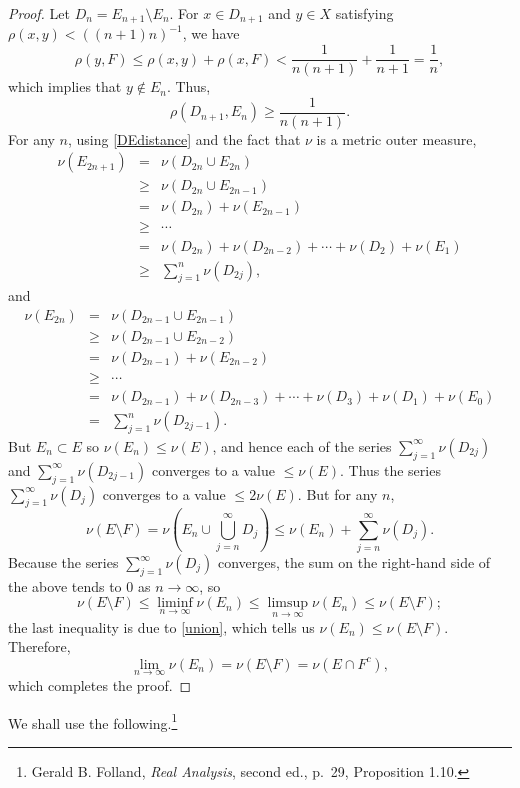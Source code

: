 \documentclass{article}
\theoremstyle{definition}
\theoremstyle{definition}
\begin{document}
\begin{proof}
Let $D_n = E_{n+1} \setminus E_n$. For $x \in D_{n+1}$ and  $y \in X$ satisfying $\rho(x,y) < ((n+1)n)^{-1}$, we have
\[
\rho(y,F) \leq \rho(x,y) + \rho(x,F) < \frac{1}{n(n+1)} + \frac{1}{n+1} = \frac{1}{n},
\]
which implies that $y \not \in E_n$. Thus,
\begin{equation}
\rho(D_{n+1},E_n) \geq \frac{1}{n(n+1)}.
\label{DEdistance}
\end{equation}
For any $n$, using \eqref{DEdistance} and the fact that $\nu$ is a metric outer measure,
\begin{eqnarray*}
\nu(E_{2n+1})&=&\nu(D_{2n} \cup E_{2n})\\
&\geq&\nu(D_{2n} \cup E_{2n-1})\\
&=&\nu(D_{2n})+\nu(E_{2n-1})\\
&\geq&\cdots\\
&=&\nu(D_{2n})+\nu(D_{2n-2})+\cdots+\nu(D_2)+\nu(E_1)\\
&\geq&\sum_{j=1}^n \nu(D_{2j}),
\end{eqnarray*}
and
\begin{eqnarray*}
\nu(E_{2n})&=&\nu(D_{2n-1} \cup E_{2n-1})\\
&\geq&\nu(D_{2n-1} \cup E_{2n-2})\\
&=&\nu(D_{2n-1})+\nu(E_{2n-2})\\
&\geq&\cdots\\
&=&\nu(D_{2n-1})+\nu(D_{2n-3})+\cdots+\nu(D_3)+\nu(D_1)+\nu(E_0)\\
&=&\sum_{j=1}^n \nu(D_{2j-1}).
\end{eqnarray*}
But $E_n \subset E$ so $\nu(E_n) \leq \nu(E)$, and hence each of the series 
$\sum_{j=1}^\infty \nu(D_{2j})$ and $\sum_{j=1}^\infty \nu(D_{2j-1})$ converges to
a value $\leq \nu(E)$. Thus the series $\sum_{j=1}^\infty \nu(D_j)$ converges to a value $\leq 2\nu(E)$.
But for any $n$, 
\[
\nu(E \setminus F) = \nu\left( E_n \cup \bigcup_{j=n}^\infty D_j \right)
\leq \nu(E_n) + \sum_{j=n}^\infty \nu(D_j).
\]
Because the series $\sum_{j=1}^\infty \nu(D_j)$ converges, the sum on the right-hand side of the above
tends to $0$ as $n \to \infty$, so
\[
\nu(E \setminus F) \leq \liminf_{n \to \infty} \nu(E_n) \leq \limsup_{n \to \infty} \nu(E_n) \leq  \nu(E \setminus F);
\]
the last inequality is due to \eqref{union}, which tells us $\nu(E_n) \leq \nu(E \setminus F)$.
Therefore, 
\[
\lim_{n \to \infty} \nu(E_n) = \nu(E \setminus F) = \nu(E \cap F^c),
\]
which completes the proof.
\end{proof}


We shall use the following.\footnote{Gerald B. Folland, {\em Real Analysis}, second ed., p.~29, Proposition 1.10.}
\end{document}
